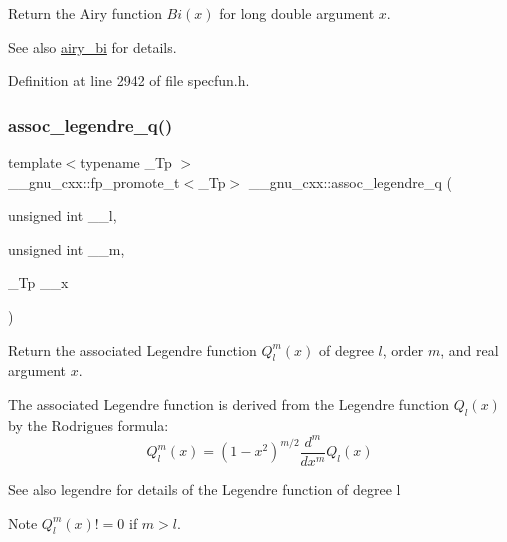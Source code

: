 Return the Airy function $ Bi(x) $ for {\ttfamily long double} argument $ x $.

\begin{DoxySeeAlso}{See also}
\hyperlink{group__gnu__math__spec__func_ga33c172cab7f8e9c99537444c7e30801a}{airy\+\_\+bi} for details. 
\end{DoxySeeAlso}


Definition at line 2942 of file specfun.\+h.

\mbox{\label{group__gnu__math__spec__func_ga96a1223727fa71ffbf520a98ac3dc885}} 
\subsubsection{\texorpdfstring{assoc\+\_\+legendre\+\_\+q()}{assoc\_legendre\_q()}}
{\footnotesize\ttfamily template$<$typename \+\_\+\+Tp $>$ \\
\+\_\+\+\_\+gnu\+\_\+cxx\+::fp\+\_\+promote\+\_\+t$<$\+\_\+\+Tp$>$ \+\_\+\+\_\+gnu\+\_\+cxx\+::assoc\+\_\+legendre\+\_\+q (\begin{DoxyParamCaption}\item[{unsigned int}]{\+\_\+\+\_\+l,  }\item[{unsigned int}]{\+\_\+\+\_\+m,  }\item[{\+\_\+\+Tp}]{\+\_\+\+\_\+x }\end{DoxyParamCaption})\hspace{0.3cm}{\ttfamily [inline]}}

Return the associated Legendre function $ Q_l^m(x) $ of degree $ l $, order $ m $, and real argument $ x $.

The associated Legendre function is derived from the Legendre function $ Q_l(x) $ by the Rodrigues formula\+: \[ Q_l^m(x) = (1 - x^2)^{m/2}\frac{d^m}{dx^m}Q_l(x) \] \begin{DoxySeeAlso}{See also}
legendre for details of the Legendre function of degree {\ttfamily l} 
\end{DoxySeeAlso}
\begin{DoxyNote}{Note}
$ Q_l^m(x) != 0 $ if $ m > l $.
\end{DoxyNote}

